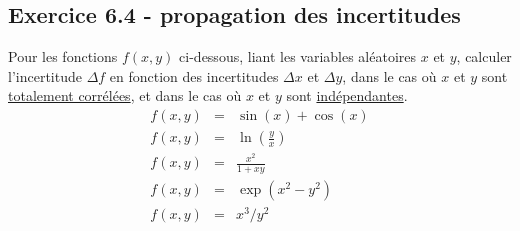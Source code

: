 \documentclass[main.tex]{subfiles}
\begin{document}
\subsection*{Exercice 6.4 - propagation des incertitudes}

Pour les fonctions $f(x,y)$ ci-dessous, liant les variables aléatoires $x$ et $y$, calculer l'incertitude $\Delta f$ en fonction des incertitudes $\Delta x$ et $\Delta y$, dans le cas où $x$ et $y$ sont \underline{totalement corrélées}, et dans le cas où $x$ et $y$ sont \underline{indépendantes}.
\begin{eqnarray*}
    f(x,y)&=&\sin(x)+\cos(x) \\
    f(x,y)&=&\ln\left(\frac{y}{x}\right) \\
    f(x,y)&=&\frac{x^2}{1+xy} \\
    f(x,y)&=&\exp(x^2-y^2) \\
    f(x,y)&=&x^3/y^2 \\
\end{eqnarray*}
\end{document}
